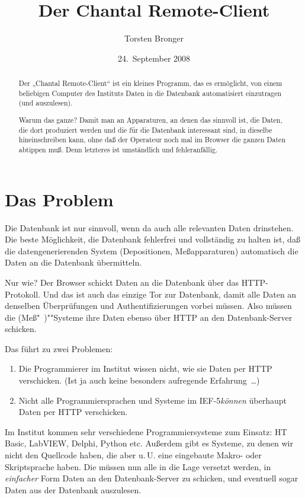 \documentclass[german,11pt]{article}
\title{Der Chantal Remote-Client}
\author{Torsten Bronger}
\date{24.~September 2008}
\newcommand{\IEF}{\mbox{IEF-5}\xspace}
\begin{document}
\nonfrenchspacing
\maketitle

\begin{abstract}
  Der „Chantal Remote-Client“ ist ein kleines Programm, das es ermöglicht, von
  einem beliebigen Computer des Instituts Daten in die Datenbank automatisiert
  einzutragen (und auszulesen).

  Warum das ganze?  Damit man an Apparaturen, an denen das sinnvoll ist, die
  Daten, die dort produziert werden und die für die Datenbank interessant sind,
  in dieselbe hineinschreiben kann, ohne daß der Operateur noch mal im Browser
  die ganzen Daten abtippen muß.  Denn letzteres ist umständlich und
  fehleranfällig.
\end{abstract}

\tableofcontents

\section{Das Problem}

Die Datenbank ist nur sinnvoll, wenn da auch alle relevanten Daten drinstehen.
Die beste Möglichkeit, die Datenbank fehlerfrei und vollständig zu halten ist,
daß die datengenerierenden System (Depositionen, Meßapparaturen) automatisch
die Daten an die Datenbank übermitteln.

Nur wie?  Der Browser schickt Daten an die Datenbank über das HTTP-Protokoll.
Und das ist auch das einzige Tor zur Datenbank, damit alle Daten an denselben
Überprüfungen und Authentifizierungen vorbei müssen.  Also müssen die
(Meß"~)""Systeme ihre Daten ebenso über HTTP an den Datenbank-Server schicken.

Das führt zu zwei Problemen:
\begin{enumerate}
\item Die Programmierer im Institut wissen nicht, wie sie Daten per HTTP
  verschicken.  (Ist ja auch keine besonders aufregende Erfahrung~…)
\item Nicht alle Programmiersprachen und Systeme im \IEF \emph{können}
  überhaupt Daten per HTTP verschicken.
\end{enumerate}

Im Institut kommen sehr verschiedene Programmiersysteme zum Einsatz: HT\,Basic,
LabVIEW, Delphi, Python etc.  Außerdem gibt es Systeme, zu denen wir nicht den
Quellcode haben, die aber u.\,U. eine eingebaute Makro- oder Skriptsprache
haben.  Die müssen nun alle in die Lage versetzt werden, in \emph{einfacher}
Form Daten an den Datenbank-Server zu schicken, und eventuell sogar Daten aus
der Datenbank auszulesen.
\end{document}
